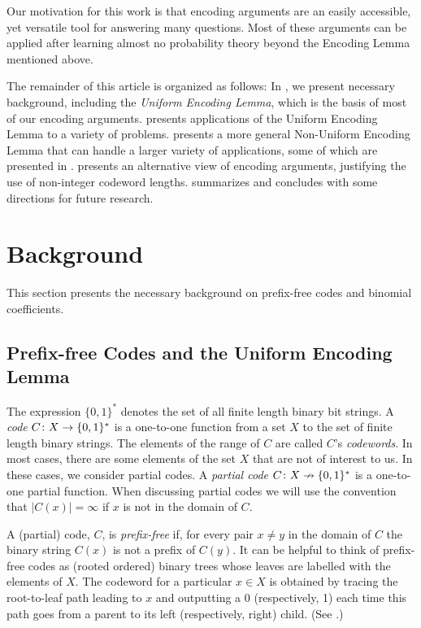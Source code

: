 \documentclass{patmorin}
\begin{document}
Our motivation for this work is that encoding arguments are an easily
accessible, yet versatile tool for answering many questions.  Most of
these arguments can be applied after learning almost no probability
theory beyond the Encoding Lemma mentioned above.

The remainder of this article is organized as follows: In
, we present necessary background, including the
\emph{Uniform Encoding Lemma}, which is the basis of most of our
encoding arguments.   presents applications of
the Uniform Encoding Lemma to a variety of problems.  
presents a more general Non-Uniform Encoding Lemma that can handle a
larger variety of applications, some of which are presented in
.   presents an alternative view of
encoding arguments, justifying the use of non-integer codeword
lengths.   summarizes and concludes with some
directions for future research.

\section{Background}

This section presents the necessary background on prefix-free codes
and binomial coefficients.

\subsection{Prefix-free Codes and the Uniform Encoding Lemma}

The expression $\{0, 1\}^*$ denotes the set of all finite length
binary bit strings. A \emph{code} $C\colon X\to \{0,1\}^*$ is a
one-to-one function from a set $X$ to the set of finite length binary
strings.  The elements of the range of $C$ are called $C$'s
\emph{codewords}.  In most cases, there are some elements of the set
$X$ that are not of interest to us.  In these cases, we consider
partial codes. A \emph{partial code} $C\colon X\nrightarrow \{0,1\}^*$
is a one-to-one partial function.  When discussing partial codes we
will use the convention that $|C(x)|=\infty$ if $x$ is not in the
domain of $C$.

A (partial) code, $C$, is \emph{prefix-free} if, for every pair
$x\neq y$ in the domain of $C$ the binary string $C(x)$ is not a
prefix of $C(y)$.  It can be helpful to think of prefix-free codes as
(rooted ordered) binary trees whose leaves are labelled with the
elements of $X$.  The codeword for a particular $x\in X$ is obtained
by tracing the root-to-leaf path leading to $x$ and outputting a 0
(respectively, 1) each time this path goes from a parent to its left
(respectively, right) child. (See .)
\end{document}
